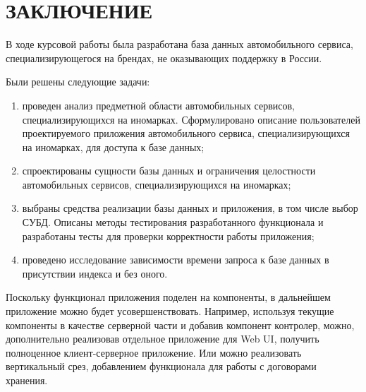 \chapter*{ЗАКЛЮЧЕНИЕ}

В ходе курсовой работы была разработана база данных автомобильного сервиса, специализирующегося на брендах, не оказывающих поддержку в России.

Были решены следующие задачи:

\begin{enumerate}
	\item проведен анализ предметной области автомобильных сервисов, специализирующихся на иномарках. Сформулировано описание пользователей проектируемого приложения автомобильного сервиса, специализирующихся на иномарках,  для доступа к базе данных;
	\item спроектированы сущности базы данных и ограничения целостности автомобильных сервисов, специализирующихся на иномарках;
	\item выбраны средства реализации базы данных и приложения, в том числе выбор СУБД. Описаны методы тестирования разработанного функционала и разработаны тесты для проверки корректности работы приложения;
	\item проведено исследование зависимости времени запроса к базе данных в присутствии индекса и без оного.
\end{enumerate}

Поскольку функционал приложения поделен на компоненты, в дальнейшем приложение можно будет усовершенствовать. Например, используя текущие компоненты в качестве серверной части и добавив компонент контролер,  можно, дополнительно реализовав отдельное приложение для Web UI, получить полноценное клиент-серверное приложение. Или можно реализовать вертикальный срез, добавлением функционала для работы с договорами хранения.
